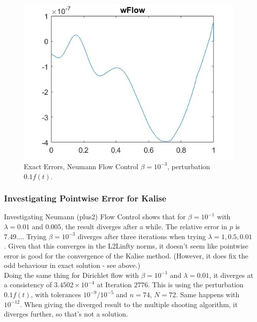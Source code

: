 \documentclass[11pt, a4paper]{article}
\theoremstyle{definition}
\begin{document}
\begin{figure}[h]
	\includegraphics[scale=0.3]{KalMw1.jpg}
	\caption{Exact Errors, Neumann Flow Control $\beta = 10^{-3}$, perturbation $0.1f(t)$.}
\end{figure}
\subsubsection*{Investigating Pointwise Error for Kalise}
Investigating Neumann (plus2) Flow Control shows that for $\beta = 10^{-1}$ with $\lambda =0.01$ and $0.005$, the result diverges after a while. The relative error in $p$ is $7.49...$. Trying $\beta = 10^{-3}$ diverges after three iterations when trying $\lambda = 1, 0.5, 0.01$. Given that this converges in the L2Linfty norms, it doesn't seem like pointwise error is good for the convergence of the Kalise method. (However, it does fix the odd behaviour in exact solution - see above.)\\
Doing the same thing for Dirichlet flow with $\beta =10^{-1}$ and $\lambda =0.01$, it diverges at a consistency of $3.4502 \times 10^{-4}$ at Iteration $2776$. 
This is using the perturbation $0.1f(t)$, with tolerances $10^{-9}/10^{-5}$ and $n=74$, $N=72$. Same happens with $10^{-12}$. When giving the diverged result to the multiple shooting algorithm, it diverges further, so that's not a solution.
\end{document}
